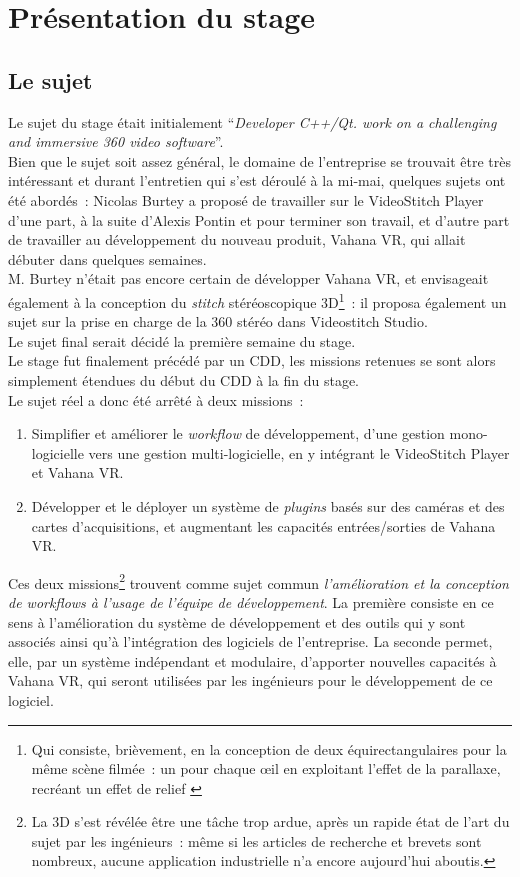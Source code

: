 \chapter{Présentation du stage}

\section{Le sujet}
\label{le-sujet}
Le sujet du stage était initialement \enquote{\textit{Developer C++/Qt.
work on a challenging and immersive 360 video software}}.\\
Bien que le sujet soit assez général, le domaine de l'entreprise se trouvait être très intéressant
et durant l'entretien qui s'est déroulé à la mi-mai, quelques sujets ont été
abordés~: Nicolas Burtey a proposé de travailler sur le VideoStitch Player d'une part,
à la suite d'Alexis Pontin et pour terminer son travail, et d'autre part de
travailler au développement du nouveau produit,
Vahana VR, qui allait débuter dans quelques semaines.\\
M. Burtey n'était pas encore certain de développer Vahana VR, 
et envisageait également à la conception du \textit{stitch} stéréoscopique 3D\footnote{Qui
consiste, brièvement, en la conception de deux équirectangulaires pour la même
scène filmée~: un pour chaque œil en exploitant l'effet de la parallaxe, recréant 
un effet de relief\cite{videostitch-stereo}
\cite{image-stereoscopique}}~: il proposa également un sujet sur 
la prise en charge de la 360 stéréo dans Videostitch Studio.\\
Le sujet final serait décidé la première semaine du stage.\\
\newline
Le stage fut finalement précédé par un CDD, les missions retenues
se sont alors simplement étendues du début du CDD à la fin du stage.\\
Le sujet réel a donc été arrêté à deux missions~:
\begin{enumerate}
  \item Simplifier et améliorer le \textit{workflow} de développement, d'une
  gestion mono-logicielle vers une gestion multi-logicielle, en y intégrant 
  le VideoStitch Player et Vahana VR.
  \item Développer et le déployer un système de \textit{plugins} basés
  sur des caméras et des cartes d'acquisitions, et augmentant les
  capacités entrées/sorties de Vahana VR.
\end{enumerate}
Ces deux missions\footnote{La 3D s'est révélée être 
une tâche trop ardue, après un rapide état de l'art du sujet par les ingénieurs~: 
même si les articles de recherche et brevets sont nombreux, aucune application 
industrielle n'a encore aujourd'hui aboutis.} trouvent comme sujet commun \emph{l'amélioration et la conception 
de \textit{workflows} à l'usage de l'équipe de développement}. La première consiste en 
ce sens à l'amélioration du système de développement et des outils qui y sont associés ainsi qu'à l'intégration des logiciels
de l'entreprise. La seconde permet, elle, par un système indépendant et modulaire, d'apporter
nouvelles capacités à Vahana VR, qui seront utilisées par les ingénieurs pour le développement de ce logiciel.

